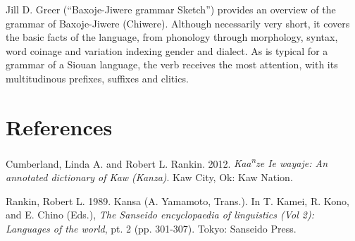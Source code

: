 \begin{refsection}
Jill D. Greer (``Baxoje-Jiwere grammar Sketch'') provides an overview of the grammar of Baxoje-Jiwere (Chiwere). Although necessarily very short, it covers the basic facts of the language, from phonology through morphology, syntax, word coinage and variation indexing gender and dialect. As is typical for a grammar of a Siouan language, the verb receives the most attention, with its multitudinous prefixes, suffixes and clitics. 

\section*{References}


\printbibliography[heading=subbibliography,notkeyword=this]


\begin{reflist}

Cumberland, Linda A. and Robert L. Rankin. 2012. \textit{Kaa\textsuperscript{n}ze Ie wayaje: An annotated dictionary of Kaw (Kanza)}. Kaw City, Ok: Kaw Nation.

Rankin, Robert L. 1989. Kansa (A. Yamamoto, Trans.). In T. Kamei, R. Kono, and E. Chino (Eds.), \textit{The Sanseido encyclopaedia of linguistics (Vol 2): Languages of the world}, pt. 2 (pp. 301-307). Tokyo: Sanseido Press.

\end{reflist}
\end{refsection}


